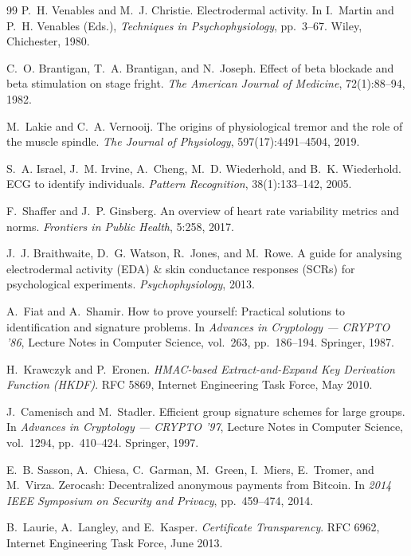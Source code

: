 \documentclass[12pt,a4paper]{article}
\begin{document}
\begin{thebibliography}{99}
P.~H. Venables and M.~J. Christie.
Electrodermal activity.
In I.~Martin and P.~H. Venables (Eds.),
\textit{Techniques in Psychophysiology}, pp.~3--67. Wiley, Chichester, 1980.

C.~O. Brantigan, T.~A. Brantigan, and N.~Joseph.
Effect of beta blockade and beta stimulation on stage fright.
\textit{The American Journal of Medicine}, 72(1):88--94, 1982.

M.~Lakie and C.~A. Vernooij.
The origins of physiological tremor and the role of the muscle spindle.
\textit{The Journal of Physiology}, 597(17):4491--4504, 2019.

S.~A. Israel, J.~M. Irvine, A.~Cheng, M.~D. Wiederhold, and B.~K. Wiederhold.
ECG to identify individuals.
\textit{Pattern Recognition}, 38(1):133--142, 2005.

F.~Shaffer and J.~P. Ginsberg.
An overview of heart rate variability metrics and norms.
\textit{Frontiers in Public Health}, 5:258, 2017.

J.~J. Braithwaite, D.~G. Watson, R.~Jones, and M.~Rowe.
A guide for analysing electrodermal activity (EDA) \& skin conductance
responses (SCRs) for psychological experiments.
\textit{Psychophysiology}, 2013.

A.~Fiat and A.~Shamir.
How to prove yourself: Practical solutions to identification and signature
problems.
In \textit{Advances in Cryptology --- CRYPTO '86}, Lecture Notes in Computer
Science, vol.~263, pp.~186--194. Springer, 1987.

H.~Krawczyk and P.~Eronen.
\textit{HMAC-based Extract-and-Expand Key Derivation Function (HKDF)}.
RFC 5869, Internet Engineering Task Force, May 2010.

J.~Camenisch and M.~Stadler.
Efficient group signature schemes for large groups.
In \textit{Advances in Cryptology --- CRYPTO '97}, Lecture Notes in Computer
Science, vol.~1294, pp.~410--424. Springer, 1997.

E.~B. Sasson, A.~Chiesa, C.~Garman, M.~Green, I.~Miers, E.~Tromer, and
M.~Virza.
Zerocash: Decentralized anonymous payments from Bitcoin.
In \textit{2014 IEEE Symposium on Security and Privacy}, pp.~459--474, 2014.

B.~Laurie, A.~Langley, and E.~Kasper.
\textit{Certificate Transparency}.
RFC 6962, Internet Engineering Task Force, June 2013.


\end{thebibliography}
\end{document}
